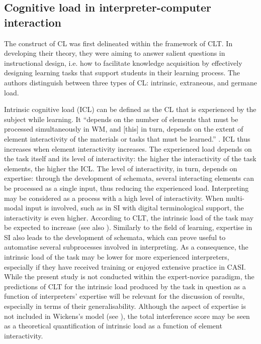 \subsection{Cognitive load in interpreter-computer interaction} \label{chandler_sweller_CLT}
The construct of CL was first delineated within the framework of  CLT. In developing their theory, they were aiming to answer salient questions in instructional design, i.e. how to facilitate knowledge acquisition by effectively designing learning tasks that support students in their learning process. The authors distinguish between three types of CL: intrinsic, extraneous, and germane load.


Intrinsic cognitive load (ICL) can be defined as the CL that is experienced by the subject while learning. It ``depends on the number of elements that must be processed simultaneously in WM, and [this] in turn, depends on the extent of element interactivity of the materials or tasks that must be learned.'' \citep[150]{van_merrienboer_cognitive_2005}. ICL thus increases when element interactivity increases. The experienced load depends on the task itself and its level of interactivity: the higher the interactivity of the task elements, the higher the ICL. The level of interactivity, in turn, depends on expertise: through the development of schemata, several interacting elements can be processed as a single input, thus reducing the experienced load. Interpreting may be considered as a process with a high level of interactivity. When multi-modal input is involved, such as in SI with digital terminological support, the interactivity is even higher. According to CLT, the intrinsic load of the task may be expected to increase (see also ). Similarly to the field of learning, expertise in SI also leads to the development of schemata, which can prove useful to automatise several subprocesses involved in interpreting. As a consequence, the intrinsic load of the task may be lower for more experienced interpreters, especially if they have received training or enjoyed extensive practice in CASI. While the present study is not conducted within the expert-novice paradigm, the predictions of CLT for the intrinsic load produced by the task in question as a function of interpreters' expertise will be relevant for the discussion of results, especially in terms of their generalisability. Although the aspect of expertise is not included in Wickens's model (see ), the total interference score may be seen as a theoretical quantification of intrinsic load as a function of element interactivity.

